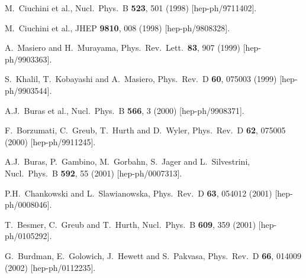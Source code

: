 \documentclass[12pt]{article}
\begin{document}
\begin{thebibliography}{999}
M.~Ciuchini et al., 
  Nucl.\ Phys.\ B {\bf 523}, 501 (1998)
  [hep-ph/9711402].

M.~Ciuchini et al.,
  JHEP {\bf 9810}, 008 (1998)
  [hep-ph/9808328].

  A.~Masiero and H.~Murayama,
  Phys.\ Rev.\ Lett.\  {\bf 83}, 907 (1999)
  [hep-ph/9903363].

S.~Khalil, T.~Kobayashi and A.~Masiero,
  Phys.\ Rev.\ D {\bf 60}, 075003 (1999)
  [hep-ph/9903544].

A.J.~Buras et al., 
  Nucl.\ Phys.\ B {\bf 566}, 3 (2000)
  [hep-ph/9908371].

F.~Borzumati, C.~Greub, T.~Hurth and D.~Wyler,
  Phys.\ Rev.\ D {\bf 62}, 075005 (2000)
  [hep-ph/9911245].

A.J.~Buras, P.~Gambino, M.~Gorbahn, S.~Jager and L.~Silvestrini,
  Nucl.\ Phys.\ B {\bf 592}, 55 (2001)
  [hep-ph/0007313].

P.H.~Chankowski and L.~Slawianowska,
  Phys.\ Rev.\ D {\bf 63}, 054012 (2001)
  [hep-ph/0008046].

T.~Besmer, C.~Greub and T.~Hurth,
  Nucl.\ Phys.\ B {\bf 609}, 359 (2001)
  [hep-ph/0105292].

G.~Burdman, E.~Golowich, J.~Hewett and S.~Pakvasa,
  Phys.\ Rev.\ D {\bf 66}, 014009 (2002)
  [hep-ph/0112235].


\end{thebibliography}
\end{document}
